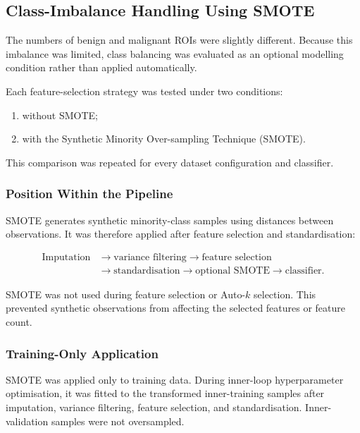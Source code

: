 \documentclass[12pt,twocolumn]{article}
\begin{document}
\subsection{Class-Imbalance Handling Using SMOTE}
\label{subsec:smote}

The numbers of benign and malignant ROIs were slightly different.
Because this imbalance was limited, class balancing was evaluated as an
optional modelling condition rather than applied automatically.

Each feature-selection strategy was tested under two conditions:

\begin{enumerate}
    \item without SMOTE;
    \item with the Synthetic Minority Over-sampling Technique (SMOTE).
\end{enumerate}

This comparison was repeated for every dataset configuration and
classifier.

\subsubsection{Position Within the Pipeline}
\label{subsubsec:smote_pipeline_position}

SMOTE generates synthetic minority-class samples using distances
between observations. It was therefore applied after feature selection
and standardisation:

\begin{equation}
\begin{aligned}
\text{Imputation}
&\longrightarrow
\text{variance filtering}
\longrightarrow
\text{feature selection}\\
&\longrightarrow
\text{standardisation}
\longrightarrow
\text{optional SMOTE}
\longrightarrow
\text{classifier}.
\end{aligned}
\label{eq:smote_pipeline_order}
\end{equation}

SMOTE was not used during feature selection or Auto-\(k\) selection.
This prevented synthetic observations from affecting the selected
features or feature count.

\subsubsection{Training-Only Application}
\label{subsubsec:smote_training_only}

SMOTE was applied only to training data. During inner-loop
hyperparameter optimisation, it was fitted to the transformed
inner-training samples after imputation, variance filtering, feature
selection, and standardisation. Inner-validation samples were not
oversampled.
\end{document}
